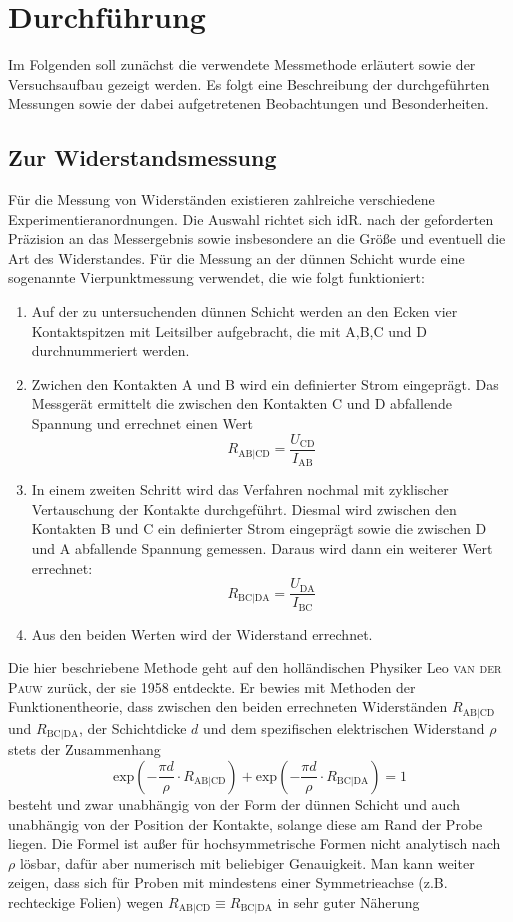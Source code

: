 \documentclass[german,  %
parskip=full,  %
]{scrartcl}
\begin{document}
\section{Durchführung}
Im Folgenden soll zunächst die verwendete Messmethode erläutert sowie der Versuchsaufbau gezeigt werden. Es folgt eine Beschreibung der durchgeführten Messungen sowie der dabei aufgetretenen Beobachtungen und Besonderheiten.
\subsection{Zur Widerstandsmessung}
Für die Messung von Widerständen existieren zahlreiche verschiedene Experimentieranordnungen. Die Auswahl richtet sich idR. nach der geforderten Präzision an das Messergebnis sowie insbesondere an die Größe und eventuell die Art des Widerstandes. Für die Messung an der dünnen Schicht wurde eine sogenannte Vierpunktmessung verwendet, die wie folgt funktioniert:
\begin{enumerate}
\item Auf der zu untersuchenden dünnen Schicht werden an den Ecken vier Kontaktspitzen mit Leitsilber aufgebracht, die mit A,B,C und D durchnummeriert werden.
\item Zwichen den Kontakten A und B wird ein definierter Strom eingeprägt. Das Messgerät ermittelt die zwischen den Kontakten C und D abfallende Spannung und errechnet einen Wert 
\[R_{\mathrm{AB|CD}} = \frac{U_{\mathrm{CD}}}{I_{\mathrm{AB}}}\]
\item In einem zweiten Schritt wird das Verfahren nochmal mit zyklischer Vertauschung der Kontakte durchgeführt. Diesmal wird zwischen den Kontakten B und C ein definierter Strom eingeprägt sowie die zwischen D und A abfallende Spannung gemessen. Daraus wird dann ein weiterer Wert errechnet:
\[R_{\mathrm{BC|DA}} = \frac{U_{\mathrm{DA}}}{I_{\mathrm{BC}}}\]
\item Aus den beiden Werten wird der Widerstand errechnet.
\end{enumerate}
Die hier beschriebene Methode geht auf den holländischen Physiker Leo \textsc{van der Pauw} zurück, der sie 1958 entdeckte. Er bewies mit Methoden der Funktionentheorie, dass zwischen den beiden errechneten Widerständen \(R_{\mathrm{AB|CD}}\) und \(R_{\mathrm{BC|DA}}\), der Schichtdicke \(d\) und dem spezifischen elektrischen Widerstand \(\rho\) stets der Zusammenhang
\[\mathrm{exp}\left(-\frac{\pi d}{\rho}\cdot R_{\mathrm{AB|CD}}\right) + \mathrm{exp}\left(-\frac{\pi d}{\rho}\cdot R_{\mathrm{BC|DA}}\right) = 1\]
besteht und zwar unabhängig von der Form der dünnen Schicht und auch unabhängig von der Position der Kontakte, solange diese am Rand der Probe liegen. Die Formel ist außer für hochsymmetrische Formen nicht analytisch nach \(\rho\) lösbar, dafür aber numerisch mit beliebiger Genauigkeit. Man kann weiter zeigen, dass sich für Proben mit mindestens einer Symmetrieachse (z.B. rechteckige Folien) wegen \(R_{\mathrm{AB|CD}} \equiv R_{\mathrm{BC|DA}}\) in sehr guter Näherung
\end{document}
